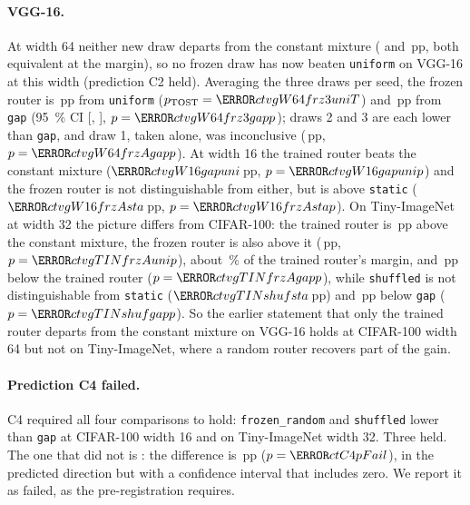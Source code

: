 \documentclass[10pt,a4paper]{article}
\begin{document}
\paragraph{VGG-16.} At width 64 neither new draw departs from the constant
mixture ( and \,pp, both equivalent at the
margin), so no frozen draw has now beaten \texttt{uniform} on VGG-16 at this
width (prediction C2 held). Averaging the three draws per seed, the frozen
router is \,pp from \texttt{uniform} ($p_{\text{TOST}}=\V{ctvgW64frz3uniT}$) and
\,pp from \texttt{gap} (\SI{95}{\percent} CI
[, ], $p=\V{ctvgW64frz3gapp}$);
draws 2 and 3 are each lower than \texttt{gap}, and draw 1, taken alone,
was inconclusive (\,pp, $p=\V{ctvgW64frzAgapp}$). At
width 16 the trained router beats the constant mixture
($\V{ctvgW16gapuni}$\,pp, $p=\V{ctvgW16gapunip}$) and the frozen router is
not distinguishable from either, but is above \texttt{static}
($\V{ctvgW16frzAsta}$\,pp, $p=\V{ctvgW16frzAstap}$). On Tiny-ImageNet at width 32 the
picture differs from CIFAR-100: the trained router is \,pp above the constant
mixture, the frozen router is also above it (\,pp,
$p=\V{ctvgTINfrzAunip}$), about \,\% of the trained
router's margin, and \,pp below the trained router
($p=\V{ctvgTINfrzAgapp}$), while \texttt{shuffled} is not distinguishable
from \texttt{static} ($\V{ctvgTINshufsta}$\,pp) and \,pp below
\texttt{gap} ($p=\V{ctvgTINshufgapp}$). So the earlier statement that only
the trained router departs from the constant mixture on VGG-16 holds at
CIFAR-100 width 64 but not on Tiny-ImageNet, where a random router
recovers part of the gain.

\paragraph{Prediction C4 failed.} C4 required all four comparisons to
hold: \texttt{frozen\_random} and \texttt{shuffled} lower than \texttt{gap} at
CIFAR-100 width 16 and on Tiny-ImageNet width 32. Three held. The one that
did not is : the difference is \,pp
($p=\V{ctC4pFail}$), in the predicted direction but with a confidence
interval that includes zero. We report it as failed, as the
pre-registration requires.
\end{document}
